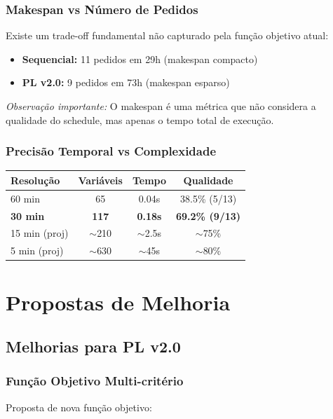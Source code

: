 \documentclass[11pt,a4paper]{article}
\begin{document}
\subsubsection{Makespan vs Número de Pedidos}

Existe um trade-off fundamental não capturado pela função objetivo atual:
\begin{itemize}
    \item \textbf{Sequencial:} 11 pedidos em 29h (makespan compacto)
    \item \textbf{PL v2.0:} 9 pedidos em 73h (makespan esparso)
\end{itemize}

\textit{Observação importante:} O makespan é uma métrica que não considera a qualidade do schedule, mas apenas o tempo total de execução.
\subsubsection{Precisão Temporal vs Complexidade}

\begin{center}
\begin{tabular}{lccc}
\toprule
\textbf{Resolução} & \textbf{Variáveis} & \textbf{Tempo} & \textbf{Qualidade} \\
\midrule
60 min & 65 & 0.04s & 38.5\% (5/13) \\
\textbf{30 min} & \textbf{117} & \textbf{0.18s} & \textbf{69.2\% (9/13)} \\
15 min (proj) & $\sim$210 & $\sim$2.5s & $\sim$75\% \\
5 min (proj) & $\sim$630 & $\sim$45s & $\sim$80\% \\
\bottomrule
\end{tabular}
\end{center}

\section{Propostas de Melhoria}

\subsection{Melhorias para PL v2.0}

\subsubsection{Função Objetivo Multi-critério}

Proposta de nova função objetivo:
\end{document}
